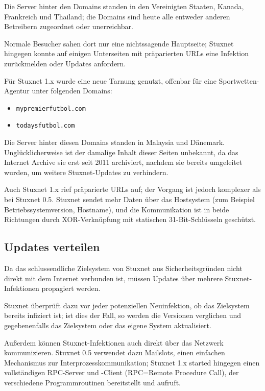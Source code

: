 \documentclass[a4paper]{article}
\begin{document}
Die Server hinter den Domains standen in den Vereinigten Staaten, Kanada, Frankreich und Thailand; %
die Domains sind heute alle entweder anderen Betreibern zugeordnet oder unerreichbar.

Normale Besucher sahen dort nur eine nichtssagende Hauptseite\cite{archive_best_advertising};
Stuxnet hingegen konnte auf einigen Unterseiten mit präparierten URLs eine Infektion zurückmelden oder Updates anfordern.

Für Stuxnet 1.x wurde eine neue Tarnung genutzt, offenbar für eine Sport\-wet\-ten-Agentur unter folgenden Domains:

\begin{itemize}
\item \texttt{mypremierfutbol.com}
\item \texttt{todaysfutbol.com}
\end{itemize}

Die Server hinter diesen Domains standen in Malaysia und Dänemark.
Un\-glück\-li\-cher\-wei\-se ist der damalige Inhalt dieser Seiten unbekannt,
da das Internet Archive sie erst seit 2011 archiviert,
nachdem sie bereits umgeleitet wurden, um weitere Stuxnet-Updates zu verhindern.

Auch Stuxnet 1.x rief präparierte URLs auf;
der Vorgang ist jedoch komplexer als bei Stuxnet 0.5.
Stuxnet sendet mehr Daten über das Hostsystem (zum Beispiel Betriebssystemversion, Hostname),
und die Kommunikation ist in beide Richtungen durch XOR-Verknüpfung mit statischen 31-Bit-Schlüsseln geschützt.

\subsection{Updates verteilen}

Da das schlussendliche Zielsystem von Stuxnet aus Sicherheitsgründen nicht direkt mit dem Internet verbunden ist,
müssen Updates über mehrere Stuxnet-Infektionen propagiert werden.

Stuxnet überprüft dazu vor jeder potenziellen Neuinfektion, ob das Zielsystem bereits infiziert ist;
ist dies der Fall, so werden die Versionen verglichen und gegebenenfalls das Zielsystem oder das eigene System aktualisiert.

Außerdem können Stuxnet-Infektionen auch direkt über das Netzwerk kommunizieren.
Stuxnet 0.5 verwendet dazu Mailslots, einen einfachen Mechanismus zur Interprozesskommunikation;
Stuxnet 1.x started hingegen einen vollständigen RPC-Server und -Client (RPC=Remote Procedure Call), %
der verschiedene Programmroutinen bereitstellt und aufruft.
\end{document}
